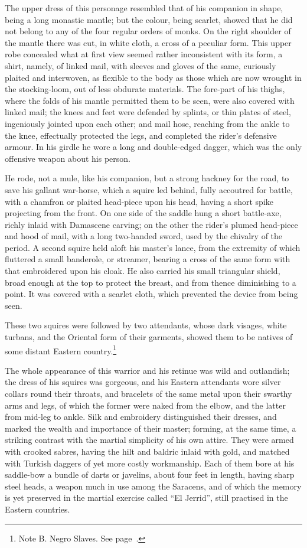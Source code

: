 The upper dress of this personage resembled that of his companion in
shape, being a long monastic mantle; but the colour, being scarlet,
showed that he did not belong to any of the four regular orders of
monks. On the right shoulder of the mantle there was cut, in white
cloth, a cross of a peculiar form. This upper robe concealed what at
first view seemed rather inconsistent with its form, a shirt, namely, of
linked mail, with sleeves and gloves of the same, curiously plaited and
interwoven, as flexible to the body as those which are now wrought in
the stocking-loom, out of less obdurate materials. The fore-part of his
thighs, where the folds of his mantle permitted them to be seen, were
also covered with linked mail; the knees and feet were defended by
splints, or thin plates of steel, ingeniously jointed upon each other;
and mail hose, reaching from the ankle to the knee, effectually
protected the legs, and completed the rider's defensive armour. In his
girdle he wore a long and double-edged dagger, which was the only
offensive weapon about his person.

He rode, not a mule, like his companion, but a strong hackney for the
road, to save his gallant war-horse, which a squire led behind, fully
accoutred for battle, with a chamfron or plaited head-piece upon his
head, having a short spike projecting from the front. On one side of the
saddle hung a short battle-axe, richly inlaid with Damascene carving; on
the other the rider's plumed head-piece and hood of mail, with a long
two-handed sword, used by the chivalry of the period. A second squire
held aloft his master's lance, from the extremity of which fluttered a
small banderole, or streamer, bearing a cross of the same form with that
embroidered upon his cloak. He also carried his small triangular shield,
broad enough at the top to protect the breast, and from thence
diminishing to a point. It was covered with a scarlet cloth, which
prevented the device from being seen.

These two squires were followed by two attendants, whose dark visages,
white turbans, and the Oriental form of their garments, showed them to
be natives of some distant Eastern country.\footnote{Note B. Negro Slaves.
See page~\pageref{noteCII}.}

The whole appearance of this warrior and his retinue was wild and
outlandish; the dress of his squires was gorgeous, and his Eastern
attendants wore silver collars round their throats, and bracelets of the
same metal upon their swarthy arms and legs, of which the former were
naked from the elbow, and the latter from mid-leg to ankle. Silk and
embroidery distinguished their dresses, and marked the wealth and
importance of their master; forming, at the same time, a striking
contrast with the martial simplicity of his own attire. They were armed
with crooked sabres, having the hilt and baldric inlaid with gold, and
matched with Turkish daggers of yet more costly workmanship. Each of
them bore at his saddle-bow a bundle of darts or javelins, about four
feet in length, having sharp steel heads, a weapon much in use among the
Saracens, and of which the memory is yet preserved in the martial
exercise called ``El Jerrid'', still practised in the Eastern countries.

